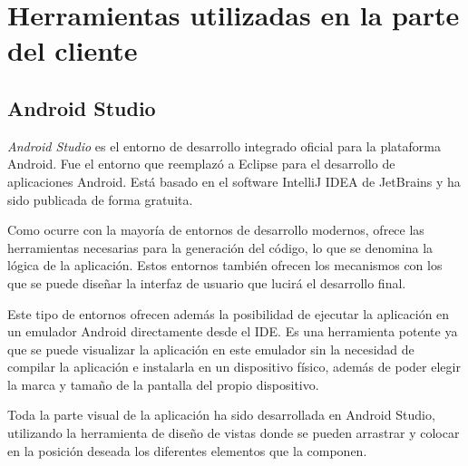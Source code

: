 \section{Herramientas utilizadas en la parte del cliente}

\subsection{Android Studio}
\textit{Android Studio} \cite{android_studio} es el entorno de desarrollo integrado oficial para la plataforma Android. Fue el entorno que reemplazó a Eclipse para el desarrollo de aplicaciones Android. Está basado en el software IntelliJ IDEA de JetBrains y ha sido publicada de forma gratuita.

Como ocurre con la mayoría de entornos de desarrollo modernos, ofrece las herramientas necesarias para la generación del código, lo que se denomina la lógica de la aplicación. Estos entornos también ofrecen los mecanismos con los que se puede diseñar la interfaz de usuario que lucirá el desarrollo final.

Este tipo de entornos ofrecen además la posibilidad de ejecutar la aplicación en un emulador Android directamente desde el IDE. Es una herramienta potente ya que se puede visualizar la aplicación en este emulador sin la necesidad de compilar la aplicación e instalarla en un dispositivo físico, además de poder elegir la marca y tamaño de la pantalla del propio dispositivo.

Toda la parte visual de la aplicación ha sido desarrollada en Android Studio, utilizando la herramienta de diseño de vistas donde se pueden arrastrar y colocar en la posición deseada los diferentes elementos que la componen.